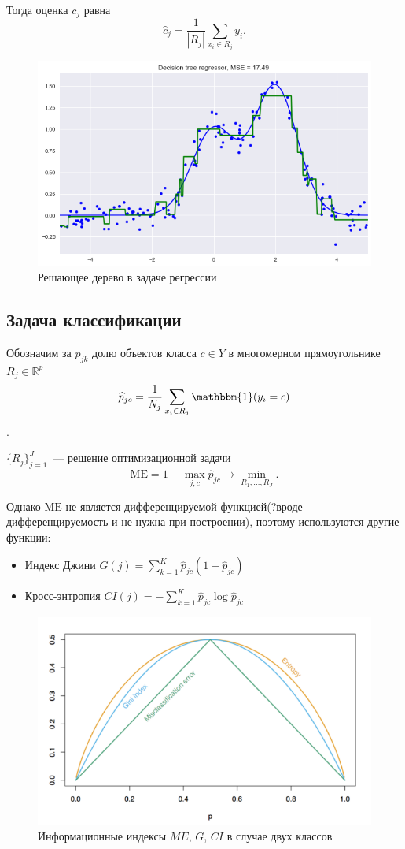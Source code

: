 \documentclass{article}
\theoremstyle{definition}
\theoremstyle{theorem}
\theoremstyle{remark}
\theoremstyle{theorem}
\theoremstyle{example}
\theoremstyle{theorem}
\theoremstyle{theorem}
\theoremstyle{theorem}
\theoremstyle{theorem}
\begin{document}
		Тогда оценка $c_j$ равна $$\widehat{c}_j=\frac1{|R_j|}\sum\limits_{x_i\in R_j}y_i.$$
		
		\begin{figure}[h!]
			\includegraphics[width=\textwidth]{reg_tree}\caption{Решающее дерево в задаче регрессии}
		\end{figure}
	\subsection{Задача классификации}
		Обозначим за $p_{jk}$ долю объектов класса $c\in Y$ в многомерном прямоугольнике $R_j\in\mathbb R^p$ $$\widehat p_{jc}=\frac1{N_j}\sum\limits_{x_i\in R_j}\mathbbm{1}(y_i=c)$$.
		
		$\{R_j\}_{j=1}^J$~--- решение оптимизационной задачи $$\mathrm{ME}=1-\max_{j,c}\widehat p_{jc}\to\min\limits_{R_1,\ldots,R_J}.$$
		
		Однако $\mathrm{ME}$ не является дифференцируемой функцией(?вроде дифференцируемость и не нужна при построении), поэтому используются другие функции:
		\begin{itemize}
			\item Индекс Джини $G(j)=\sum\limits_{k=1}^K\widehat p_{jc}(1-\widehat p_{jc})$
			\item Кросс-энтропия $CI(j)=-\sum\limits_{k=1}^K\widehat p_{jc}\log\widehat p_{jc}$
		\end{itemize}
		
		\begin{figure}[h!]
		\includegraphics[width=\textwidth]{entr}\caption{Информационные индексы $ME$, $G$, $CI$ в случае двух классов}		
		\end{figure}
		
\end{document}
